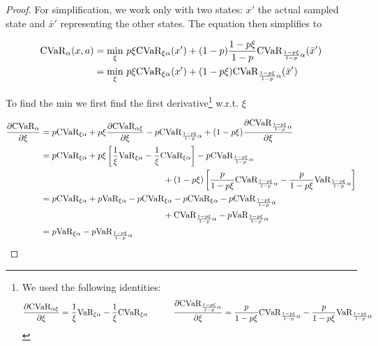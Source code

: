 \begin{proof}
For simplification, we work only with two states: $x'$ the actual sampled state and $\bar{x}'$ representing the other states. The equation then simplifies to

\begin{equation}\label{eqn:cvardecomp2}
\begin{split}
\text{CVaR}_\alpha(x, a)&=\min_{\xi} \, p\xi \text{CVaR}_{\xi\alpha}(x') + (1-p)\dfrac{1-p\xi}{1-p}\text{CVaR}_{\frac{1-p\xi}{1-p}\alpha}(\bar{x}')\\
&=\min_{\xi} \, p\xi \text{CVaR}_{\xi\alpha}(x') + (1-p\xi)\text{CVaR}_{\frac{1-p\xi}{1-p}\alpha}(\bar{x}')\\
\end{split}
\end{equation}

To find the min we first find the first derivative\footnote{
We used the following identities:
\begin{equation*}
\dfrac{\partial \text{CVaR}_{\alpha\xi}}{\partial \xi} = \frac{1}{\xi}\text{VaR}_{\xi\alpha}-\frac{1}{\xi}\text{CVaR}_{\xi\alpha}\quad\quad\quad
\dfrac{\partial \text{CVaR}_{\frac{1-p\xi}{1-p}\alpha}}{\partial\xi} = \frac{p}{1-p\xi}\text{CVaR}_{\frac{1-p\xi}{1-p}\alpha}	-	\frac{p}{1-p\xi}\text{VaR}_{\frac{1-p\xi}{1-p}\alpha}
\end{equation*}
} w.r.t. $\xi$

\begin{equation}
\begin{split}
\dfrac{\partial \cvar_\alpha}{\partial \xi} &= p\cvar_{\xi\alpha} + p\xi \dfrac{\partial \cvar_{\alpha\xi}}{\partial \xi} - p\cvar_{\frac{1-p\xi}{1-p}\alpha} + (1 - p\xi)\dfrac{\partial \cvar_{\frac{1-p\xi}{1-p}\alpha}}{\partial\xi}\\
&= p\cvar_{\xi\alpha} + p\xi\left[	\frac{1}{\xi}\var_{\xi\alpha}-\frac{1}{\xi}\cvar_{\xi\alpha}	\right] - p\cvar_{\frac{1-p\xi}{1-p}\alpha} \\&\hspace*{5cm} + (1-p\xi)\left[	\frac{p}{1-p\xi}\cvar_{\frac{1-p\xi}{1-p}\alpha}	-	\frac{p}{1-p\xi}\var_{\frac{1-p\xi}{1-p}\alpha}\right]\\
&= p\cvar_{\xi\alpha} + p\var_{\xi\alpha} - p\cvar_{\xi\alpha} - p\cvar_{\xi\alpha} - p\cvar_{\frac{1-p\xi}{1-p}\alpha} \\&\hspace*{5cm} + \cvar_{\frac{1-p\xi}{1-p}\alpha} - p\var_{\frac{1-p\xi}{1-p}\alpha}\\
&= p\var_{\xi\alpha} - p\var_{\frac{1-p\xi}{1-p}\alpha}
\end{split}
\end{equation}


\end{proof}
